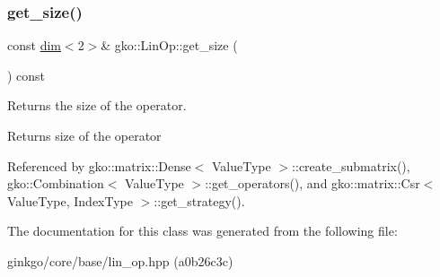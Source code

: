 \subsubsection{\texorpdfstring{get\+\_\+size()}{get\_size()}}
{\footnotesize\ttfamily const \hyperlink{structgko_1_1dim}{dim}$<$2$>$\& gko\+::\+Lin\+Op\+::get\+\_\+size (\begin{DoxyParamCaption}{ }\end{DoxyParamCaption}) const\hspace{0.3cm}{\ttfamily [noexcept]}}



Returns the size of the operator. 

\begin{DoxyReturn}{Returns}
size of the operator 
\end{DoxyReturn}


Referenced by gko\+::matrix\+::\+Dense$<$ Value\+Type $>$\+::create\+\_\+submatrix(), gko\+::\+Combination$<$ Value\+Type $>$\+::get\+\_\+operators(), and gko\+::matrix\+::\+Csr$<$ Value\+Type, Index\+Type $>$\+::get\+\_\+strategy().



The documentation for this class was generated from the following file\+:\begin{DoxyCompactItemize}
\item 
ginkgo/core/base/lin\+\_\+op.\+hpp (a0b26c3c)\end{DoxyCompactItemize}
